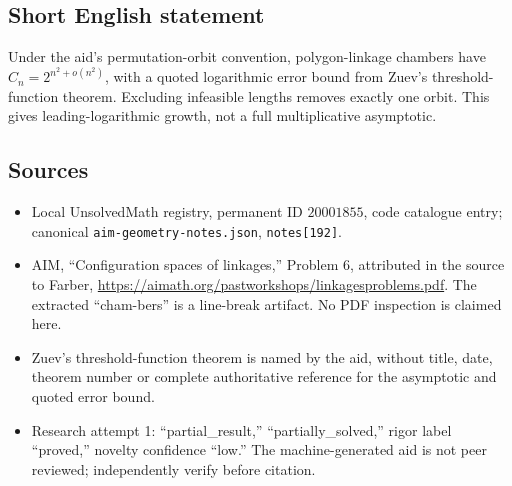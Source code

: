 \documentclass[11pt]{article}
\begin{document}
\subsection{Short English statement}
Under the aid's permutation-orbit convention, polygon-linkage chambers have \(C_n=2^{n^2+o(n^2)}\), with a quoted logarithmic error bound from Zuev's threshold-function theorem. Excluding infeasible lengths removes exactly one orbit. This gives leading-logarithmic growth, not a full multiplicative asymptotic.
\subsection{Sources}
\begin{itemize}
\item Local UnsolvedMath registry, permanent ID \(20001855\), code catalogue entry; canonical \texttt{aim-geometry-notes.json}, \texttt{notes[192]}.
\item AIM, ``Configuration spaces of linkages,'' Problem 6, attributed in the source to Farber, \url{https://aimath.org/pastworkshops/linkagesproblems.pdf}. The extracted ``cham-bers'' is a line-break artifact. No PDF inspection is claimed here.
\item Zuev's threshold-function theorem is named by the aid, without title, date, theorem number or complete authoritative reference for the asymptotic and quoted error bound.
\item Research attempt 1: ``partial\_result,'' ``partially\_solved,'' rigor label ``proved,'' novelty confidence ``low.'' The machine-generated aid is not peer reviewed; independently verify before citation.
\end{itemize}
\end{document}
